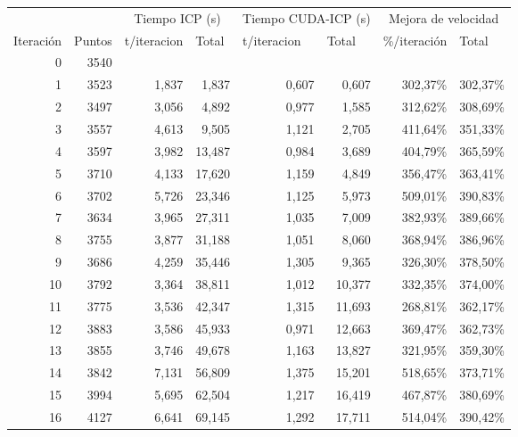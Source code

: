 \begin{table}[h]
    \centering
      \begin{tabular}{rrrrrrrr}
            &       & \multicolumn{2}{c}{Tiempo ICP (s)} & \multicolumn{2}{c}{Tiempo CUDA-ICP (s)} & \multicolumn{2}{c}{Mejora de velocidad} \\
      \multicolumn{1}{l}{Iteración} & \multicolumn{1}{l}{Puntos} & \multicolumn{1}{l}{t/iteracion} & \multicolumn{1}{l}{Total} & \multicolumn{1}{l}{t/iteracion} & \multicolumn{1}{l}{Total} & \multicolumn{1}{l}{\%/iteración} & \multicolumn{1}{l}{Total} \\
      0     & 3540  &       &       &       &       &       &  \\
      1     & 3523  & 1,837 & 1,837 & 0,607 & 0,607 & 302,37\% & 302,37\% \\
      2     & 3497  & 3,056 & 4,892 & 0,977 & 1,585 & 312,62\% & 308,69\% \\
      3     & 3557  & 4,613 & 9,505 & 1,121 & 2,705 & 411,64\% & 351,33\% \\
      4     & 3597  & 3,982 & 13,487 & 0,984 & 3,689 & 404,79\% & 365,59\% \\
      5     & 3710  & 4,133 & 17,620 & 1,159 & 4,849 & 356,47\% & 363,41\% \\
      6     & 3702  & 5,726 & 23,346 & 1,125 & 5,973 & 509,01\% & 390,83\% \\
      7     & 3634  & 3,965 & 27,311 & 1,035 & 7,009 & 382,93\% & 389,66\% \\
      8     & 3755  & 3,877 & 31,188 & 1,051 & 8,060 & 368,94\% & 386,96\% \\
      9     & 3686  & 4,259 & 35,446 & 1,305 & 9,365 & 326,30\% & 378,50\% \\
      10    & 3792  & 3,364 & 38,811 & 1,012 & 10,377 & 332,35\% & 374,00\% \\
      11    & 3775  & 3,536 & 42,347 & 1,315 & 11,693 & 268,81\% & 362,17\% \\
      12    & 3883  & 3,586 & 45,933 & 0,971 & 12,663 & 369,47\% & 362,73\% \\
      13    & 3855  & 3,746 & 49,678 & 1,163 & 13,827 & 321,95\% & 359,30\% \\
      14    & 3842  & 7,131 & 56,809 & 1,375 & 15,201 & 518,65\% & 373,71\% \\
      15    & 3994  & 5,695 & 62,504 & 1,217 & 16,419 & 467,87\% & 380,69\% \\
      16    & 4127  & 6,641 & 69,145 & 1,292 & 17,711 & 514,04\% & 390,42\% \\

\end{tabular}
\end{table}
